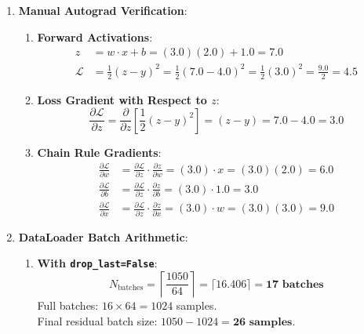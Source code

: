 \begin{enumerate}
    \item \textbf{Manual Autograd Verification}:
    \begin{enumerate}[label=(\alph*)]
        \item \textbf{Forward Activations}:
        \begin{align*}
        z &= w \cdot x + b = (3.0)(2.0) + 1.0 = \mathbf{7.0} \\
        \mathcal{L} &= \frac{1}{2}(z - y)^2 = \frac{1}{2}(7.0 - 4.0)^2 = \frac{1}{2}(3.0)^2 = \frac{9.0}{2} = \mathbf{4.5}
        \end{align*}

        \item \textbf{Loss Gradient with Respect to $z$}:
        \begin{equation*}
        \frac{\partial \mathcal{L}}{\partial z} = \frac{\partial}{\partial z}\left[ \frac{1}{2}(z - y)^2 \right] = (z - y) = 7.0 - 4.0 = \mathbf{3.0}
        \end{equation*}

        \item \textbf{Chain Rule Gradients}:
        \begin{align*}
        \frac{\partial \mathcal{L}}{\partial w} &= \frac{\partial \mathcal{L}}{\partial z} \cdot \frac{\partial z}{\partial w} = (3.0) \cdot x = (3.0)(2.0) = \mathbf{6.0} \\
        \frac{\partial \mathcal{L}}{\partial b} &= \frac{\partial \mathcal{L}}{\partial z} \cdot \frac{\partial z}{\partial b} = (3.0) \cdot 1.0 = \mathbf{3.0} \\
        \frac{\partial \mathcal{L}}{\partial x} &= \frac{\partial \mathcal{L}}{\partial z} \cdot \frac{\partial z}{\partial x} = (3.0) \cdot w = (3.0)(3.0) = \mathbf{9.0}
        \end{align*}
    \end{enumerate}

    \item \textbf{DataLoader Batch Arithmetic}:
    \begin{enumerate}[label=(\alph*)]
        \item \textbf{With \texttt{drop\_last=False}}:
        \begin{equation*}
        N_{\text{batches}} = \left\lceil \frac{1050}{64} \right\rceil = \lceil 16.406 \rceil = \mathbf{17\text{ batches}}
        \end{equation*}
        Full batches: $16 \times 64 = 1024$ samples. \\
        Final residual batch size: $1050 - 1024 = \mathbf{26\text{ samples}}$.


\end{enumerate}
\end{enumerate}
